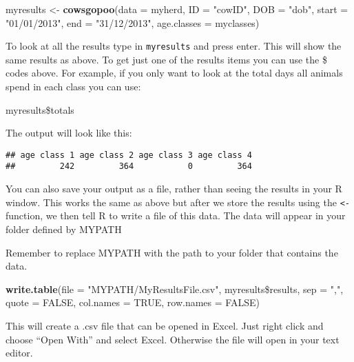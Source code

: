 \documentclass[12pt]{article}
\newcommand{\KeywordTok}[1]{\textcolor[rgb]{0.13,0.29,0.53}{\textbf{{#1}}}}
\newcommand{\DataTypeTok}[1]{\textcolor[rgb]{0.13,0.29,0.53}{{#1}}}
\newcommand{\StringTok}[1]{\textcolor[rgb]{0.31,0.60,0.02}{{#1}}}
\newcommand{\OtherTok}[1]{\textcolor[rgb]{0.56,0.35,0.01}{{#1}}}
\newcommand{\NormalTok}[1]{{#1}}
\begin{document}
\begin{snugshade}
\begin{Highlighting}[]
\NormalTok{myresults <-}\StringTok{ }\KeywordTok{cowsgopoo}\NormalTok{(}\DataTypeTok{data =} \NormalTok{myherd, } \DataTypeTok{ID =} \StringTok{"cowID"}\NormalTok{, }\DataTypeTok{DOB =} \StringTok{"dob"}\NormalTok{, }
                       \DataTypeTok{start =} \StringTok{"01/01/2013"}\NormalTok{, }\DataTypeTok{end =} \StringTok{"31/12/2013"}\NormalTok{, }
                       \DataTypeTok{age.classes =} \NormalTok{myclasses)}
\end{Highlighting}
\end{snugshade}

To look at all the results type in \texttt{myresults} and press enter. This will show the same results as above. To get just one of the results items you can use the \$ codes above. For example, if you only want to look at the total days all animals spend in each class you can use:

\begin{snugshade}
\begin{Highlighting}[]
\NormalTok{myresults\$totals}
\end{Highlighting}
\end{snugshade}

The output will look like this:

\begin{verbatim}
## age class 1 age class 2 age class 3 age class 4 
##         242         364           0         364 
\end{verbatim}

You can also save your output as a file, rather than seeing the results in your R window. This works the same as above but after we store the results using the \texttt{<-} function, we then tell R to write a file of this data. The data will appear in your folder defined by MYPATH

\begin{framed}
Remember to replace MYPATH with the path to your folder that contains the data.
\end{framed}

\begin{snugshade}
\begin{Highlighting}[]
\KeywordTok{write.table}\NormalTok{(}\DataTypeTok{file =} \StringTok{"MYPATH/MyResultsFile.csv"}\NormalTok{, myresults\$results, } \DataTypeTok{sep =} \StringTok{","}\NormalTok{, }
            \DataTypeTok{quote =} \StringTok{FALSE}\NormalTok{, }\DataTypeTok{col.names =} \OtherTok{TRUE}\NormalTok{, }\DataTypeTok{row.names =} \OtherTok{FALSE}\NormalTok{)}
\end{Highlighting}
\end{snugshade}

This will create a .csv file that can be opened in Excel. Just right click and choose ``Open With'' and select Excel. Otherwise the file will open in your text editor.
\end{document}
